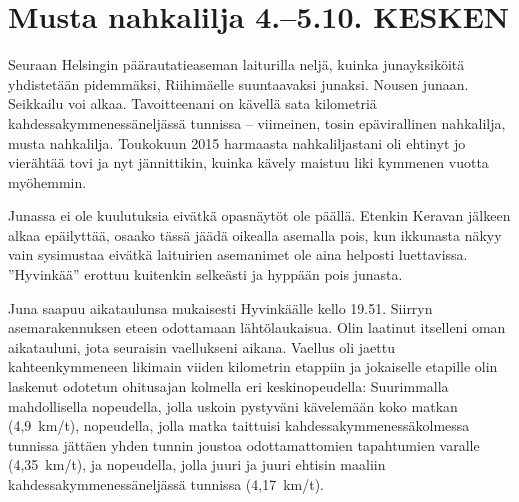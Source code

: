 \section{Musta nahkalilja 4.--5.10. KESKEN}

\begin{multicols}{2}
\noindent Seuraan Helsingin päärautatieaseman laiturilla neljä, kuinka junayksiköitä yhdistetään pidemmäksi, Riihimäelle suuntaavaksi junaksi. Nousen junaan. Seikkailu voi alkaa. Tavoitteenani on kävellä sata kilometriä kahdessakymmenessäneljässä tunnissa -- viimeinen, tosin epävirallinen nahkalilja, musta nahkalilja. Toukokuun 2015 harmaasta nahkaliljastani oli ehtinyt jo vierähtää tovi ja nyt jännittikin, kuinka kävely maistuu liki kymmenen vuotta myöhemmin.

Junassa ei ole kuulutuksia eivätkä opasnäytöt ole päällä. Etenkin Keravan jälkeen alkaa epäilyttää, osaako tässä jäädä oikealla asemalla pois, kun ikkunasta näkyy vain sysimustaa eivätkä laituirien asemanimet ole aina helposti luettavissa. ''Hyvinkää'' erottuu kuitenkin selkeästi ja hyppään pois junasta. 

Juna saapuu aikataulunsa mukaisesti Hyvinkäälle kello 19.51. Siirryn asemarakennuksen eteen odottamaan lähtölaukaisua. Olin laatinut itselleni oman aikatauluni, jota seuraisin vaellukseni aikana. Vaellus oli jaettu kahteenkymmeneen likimain viiden kilometrin etappiin ja jokaiselle etapille olin laskenut odotetun ohitusajan kolmella eri keskinopeudella: Suurimmalla mahdollisella nopeudella, jolla uskoin pystyväni kävelemään koko matkan (4,9~km/t), nopeudella, jolla matka taittuisi kahdessakymmenessäkolmessa tunnissa jättäen yhden tunnin joustoa odottamattomien tapahtumien varalle (4,35~km/t), ja nopeudella, jolla juuri ja juuri ehtisin maaliin kahdessakymmenessäneljässä tunnissa (4,17~km/t).


\end{multicols}
